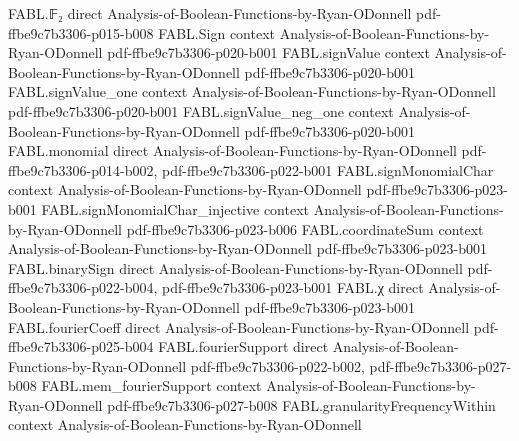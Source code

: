 \begin{theorem}
\label{FABL.BooleanCircuit.output_true_of_toWidthThreeCNF_eval}
\leanok
{}
\proofstep
  {FABL.𝔽₂}
  {direct}
  {Analysis-of-Boolean-Functions-by-Ryan-ODonnell}
  {pdf-ffbe9c7b3306-p015-b008}
\proofstep
  {FABL.Sign}
  {context}
  {Analysis-of-Boolean-Functions-by-Ryan-ODonnell}
  {pdf-ffbe9c7b3306-p020-b001}
\proofstep
  {FABL.signValue}
  {context}
  {Analysis-of-Boolean-Functions-by-Ryan-ODonnell}
  {pdf-ffbe9c7b3306-p020-b001}
\proofstep
  {FABL.signValue_one}
  {context}
  {Analysis-of-Boolean-Functions-by-Ryan-ODonnell}
  {pdf-ffbe9c7b3306-p020-b001}
\proofstep
  {FABL.signValue_neg_one}
  {context}
  {Analysis-of-Boolean-Functions-by-Ryan-ODonnell}
  {pdf-ffbe9c7b3306-p020-b001}
\proofstep
  {FABL.monomial}
  {direct}
  {Analysis-of-Boolean-Functions-by-Ryan-ODonnell}
  {pdf-ffbe9c7b3306-p014-b002,
    pdf-ffbe9c7b3306-p022-b001}
\proofstep
  {FABL.signMonomialChar}
  {context}
  {Analysis-of-Boolean-Functions-by-Ryan-ODonnell}
  {pdf-ffbe9c7b3306-p023-b001}
\proofstep
  {FABL.signMonomialChar_injective}
  {context}
  {Analysis-of-Boolean-Functions-by-Ryan-ODonnell}
  {pdf-ffbe9c7b3306-p023-b006}
\proofstep
  {FABL.coordinateSum}
  {context}
  {Analysis-of-Boolean-Functions-by-Ryan-ODonnell}
  {pdf-ffbe9c7b3306-p023-b001}
\proofstep
  {FABL.binarySign}
  {direct}
  {Analysis-of-Boolean-Functions-by-Ryan-ODonnell}
  {pdf-ffbe9c7b3306-p022-b004,
    pdf-ffbe9c7b3306-p023-b001}
\proofstep
  {FABL.χ}
  {direct}
  {Analysis-of-Boolean-Functions-by-Ryan-ODonnell}
  {pdf-ffbe9c7b3306-p023-b001}
\proofstep
  {FABL.fourierCoeff}
  {direct}
  {Analysis-of-Boolean-Functions-by-Ryan-ODonnell}
  {pdf-ffbe9c7b3306-p025-b004}
\proofstep
  {FABL.fourierSupport}
  {direct}
  {Analysis-of-Boolean-Functions-by-Ryan-ODonnell}
  {pdf-ffbe9c7b3306-p022-b002,
    pdf-ffbe9c7b3306-p027-b008}
\proofstep
  {FABL.mem_fourierSupport}
  {context}
  {Analysis-of-Boolean-Functions-by-Ryan-ODonnell}
  {pdf-ffbe9c7b3306-p027-b008}
\proofstep
  {FABL.granularityFrequencyWithin}
  {context}
  {Analysis-of-Boolean-Functions-by-Ryan-ODonnell}

\end{theorem}
